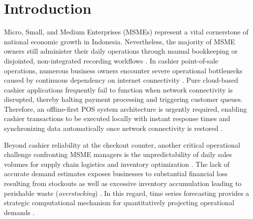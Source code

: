 \documentclass[10pt,a4paper]{article}
\begin{document}
\section{Introduction}

Micro, Small, and Medium Enterprises (MSMEs) represent a vital cornerstone of national economic growth in Indonesia. Nevertheless, the majority of MSME owners still administer their daily operations through manual bookkeeping or disjointed, non-integrated recording workflows \cite{sipayung2020}. In cashier point-of-sale operations, numerous business owners encounter severe operational bottlenecks caused by continuous dependency on internet connectivity \cite{siddik2020}. Pure cloud-based cashier applications frequently fail to function when network connectivity is disrupted, thereby halting payment processing and triggering customer queues. Therefore, an offline-first POS system architecture is urgently required, enabling cashier transactions to be executed locally with instant response times and synchronizing data automatically once network connectivity is restored \cite{flutter2026}.

Beyond cashier reliability at the checkout counter, another critical operational challenge confronting MSME managers is the unpredictability of daily sales volumes for supply chain logistics and inventory optimization \cite{hyndman2021}. The lack of accurate demand estimates exposes businesses to substantial financial loss resulting from stockouts as well as excessive inventory accumulation leading to perishable waste (\textit{overstocking}) \cite{box2015}. In this regard, time series forecasting provides a strategic computational mechanism for quantitatively projecting operational demands \cite{hyndman2006}.
\end{document}
